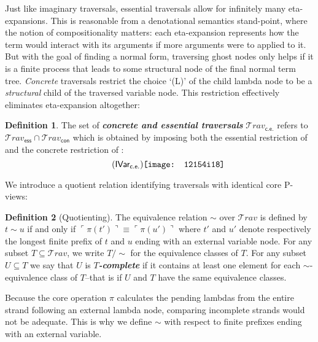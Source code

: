 \documentclass[xchauthor,chkrefs,GCNS,amsmath,amsthm,rotating,leaveRGB]{tcsg}
\renewcommand{\index}[1]{}
\theoremstyle{plain}
\theoremstyle{definition}
\newtheorem{definition}{Definition}[section]
\newcommand\travset{\mathcal{T}\!rav}
\newcommand{\essential}{\mathsf{ess}}
\newcommand{\concrete}{\mathsf{con}}
\newcommand{\concreteessential}{\mathsf{c.e.}}
\newcommand{\travsetes}{{\travset_{\essential}}}
\newcommand{\travsetcon}{{\travset_{\concrete}}}
\newcommand{\travsetcones}{\travset_{\concreteessential}}
\newcommand{\travulc}{\travset}
\newcommand{\rulefont}[1]{\mathbf{\mathsf{#1}}}
\def\coresymbol{\pi}
\newcommand{\core}[1]{\coresymbol(#1)}
\begin{document}
Just like imaginary traversals, essential traversals allow for infinitely
many eta-expansions. This is reasonable from a denotational semantics
stand-point, where the notion of compositionality matters: each eta-expansion
represents how the term would interact with its arguments if more arguments
were to  applied to it. But with the goal of finding a normal form,
traversing ghost nodes only helps if it is a finite process that leads to
some structural node of the final normal term tree. \emph{Concrete}
traversals restrict the choice `(L)' of the child lambda node to be a
\emph{structural} child of the traversed variable node. This restriction
effectively eliminates eta-expansion altogether:

\begin{definition}\label{dfn:essential_concrete_traversals}
The set of \textbf{\emph{concrete and essential traversals}}\index{concrete
and essential traversals} $\travsetcones $ refers to $\travsetes \cap
\travsetcon $ which is obtained by imposing both the essential restriction of
 and the concrete
restriction of :
%
\begin{equation}
\tag{$\rulefont{IVar_{\concreteessential} }$}
\texttt{[image: 12154i18]}
\end{equation}
\end{definition}

We introduce a quotient relation identifying traversals with identical core
P-views:

\begin{definition}[Quotienting]
The equivalence relation $\sim $ over $\travulc $ is defined by $t \sim u$ if
and only if $\ulcorner  \core {t'} \urcorner   \equiv \ulcorner  \core {u'}
\urcorner  $ where $t'$ and $u'$ denote respectively the longest finite
prefix of $t$ and $u$ ending with an external variable node. For any subset
$T\subseteq \travulc $, we write $T/{\sim }$ for the equivalence classes of
$T$. For any subset $U\subseteq T$ we say that $U$ is
\textbf{\emph{$T$-complete}}\index{$T$-complete} if it contains at least one
element for each $\sim $-equivalence class of $T$--that is if $U$ and $T$
have the same equivalence classes.
\end{definition}

Because the core operation $\coresymbol $ calculates the pending lambdas from
the entire strand following an external lambda node, comparing incomplete
strands would not be adequate. This is why we define $\sim $ with respect to
finite prefixes ending with an external variable.
\end{document}
